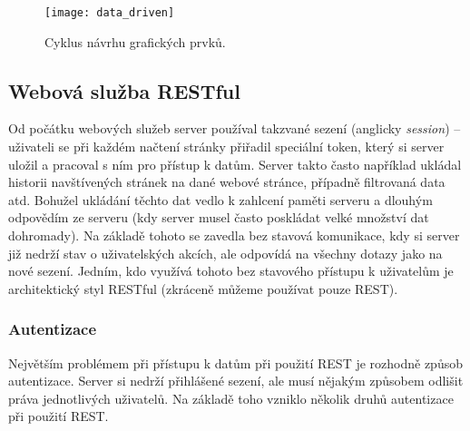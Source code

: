 \begin{figure}[h]
\centering
\texttt{[image: data\_driven]}
\caption{Cyklus návrhu grafických prvků.}
\label{data-cycle}
\end{figure}

\subsection{Webová služba RESTful}
\par Od počátku webových služeb server používal takzvané sezení (anglicky \textit{session}) -- uživateli se při každém načtení stránky přiřadil speciální token, který si server uložil a pracoval s ním pro přístup k datům. Server takto často například ukládal historii navštívených stránek na dané webové stránce, případně filtrovaná data atd. Bohužel ukládání těchto dat vedlo k zahlcení paměti serveru a dlouhým odpovědím ze serveru (kdy server musel často poskládat velké množství dat dohromady). Na základě tohoto se zavedla bez stavová komunikace, kdy si server již nedrží stav o uživatelských akcích, ale odpovídá na všechny dotazy jako na nové sezení. Jedním, kdo využívá tohoto bez stavového přístupu k uživatelům je architektický styl RESTful (zkráceně můžeme používat pouze REST). \cite{rest-cookbook}

\subsubsection{Autentizace}
Největším problémem při přístupu k datům při použití REST je rozhodně způsob autentizace. Server si nedrží přihlášené sezení, ale musí nějakým způsobem odlišit práva jednotlivých uživatelů. Na základě toho vzniklo několik druhů autentizace při použití REST. \cite{rest-cookbook}

